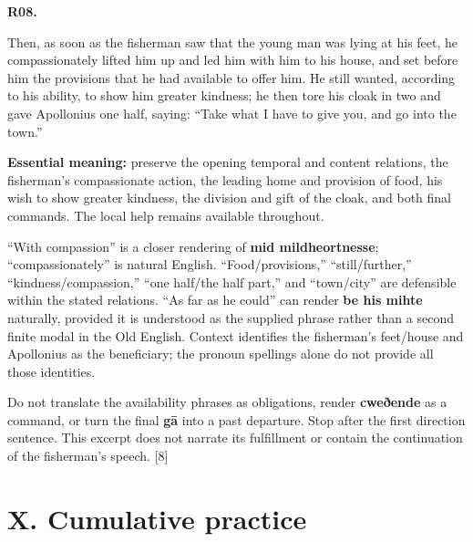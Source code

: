 \par\begin{minipage}{\linewidth}\raggedright
\textbf{R08.}

Then, as soon as the fisherman saw that the young man was lying at his feet, he compassionately lifted him up and led him with him to his house, and set before him the provisions that he had available to offer him. He still wanted, according to his ability, to show him greater kindness; he then tore his cloak in two and gave Apollonius one half, saying: “Take what I have to give you, and go into the town.”

\textbf{Essential meaning:} preserve the opening temporal and content relations, the fisherman’s compassionate action, the leading home and provision of food, his wish to show greater kindness, the division and gift of the cloak, and both final commands. The local help remains available throughout.

“With compassion” is a closer rendering of \textbf{mid mildheortnesse}; “compassionately” is natural English. “Food/\allowbreak{}provisions,” “still/\allowbreak{}further,” “kindness/\allowbreak{}compassion,” “one half/\allowbreak{}the half part,” and “town/\allowbreak{}city” are defensible within the stated relations. “As far as he could” can render \textbf{be his mihte} naturally, provided it is understood as the supplied phrase rather than a second finite modal in the Old English. Context identifies the fisherman’s feet/\allowbreak{}house and Apollonius as the beneficiary; the pronoun spellings alone do not provide all those identities.

Do not translate the availability phrases as obligations, render \textbf{cweðende} as a command, or turn the final \textbf{gā} into a past departure. Stop after the first direction sentence. This excerpt does not narrate its fulfillment or contain the continuation of the fisherman’s speech. [8]

\end{minipage}\par\addvspace{4pt}

\section*{X. Cumulative practice}

